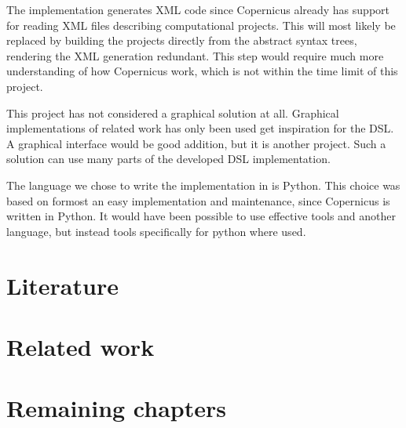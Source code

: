 The implementation generates XML code since Copernicus already has
support for reading XML files describing computational projects. This
will most likely be replaced by building the projects directly from
the abstract syntax trees, rendering the XML generation
redundant. This step would require much more understanding of how
Copernicus work, which is not within the time limit of this project.

This project has not considered a graphical solution at all. Graphical
implementations of related work has only been used get inspiration for
the DSL. A graphical interface would be good addition, but it is
another project. Such a solution can use many parts of the developed
DSL implementation.

The language we chose to write the implementation in is Python. This
choice was based on formost an easy implementation and maintenance,
since Copernicus is written in Python. It would have been possible to
use effective tools and another language, but instead tools
specifically for python where used.




\section{Literature}


\section{Related work}

\section{Remaining chapters}

